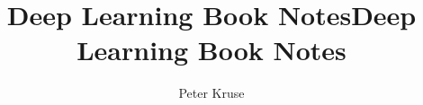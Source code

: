 \documentclass{article}
\title{Deep Learning Book Notes}
\begin{document}
\maketitle

\title{Deep Learning Book Notes}
\author{Peter Kruse}

\tableofcontents



\end{document}
